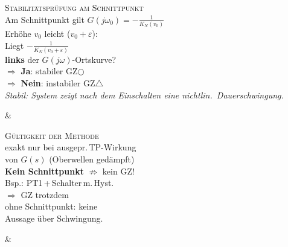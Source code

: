 
\begin{formelreihe}
  \parbox[t]{\linewidth}{%
    {\scriptsize\scshape\color{gray!65!black} Stabilitätsprüfung am Schnittpunkt}\\[0.03em]%
    \scriptsize
    Am Schnittpunkt gilt $G(j\omega_0)=-\tfrac{1}{K_N(v_0)}$\\[0.04em]
    Erhöhe $v_0$ leicht ($v_0\!+\!\varepsilon$):\\[0.03em]
    Liegt $-\tfrac{1}{K_N(v_0\!+\!\varepsilon)}$\\
    \quad\textbf{links} der $G(j\omega)$-Ortskurve?\\[0.04em]
    $\Rightarrow$ \textbf{Ja}: stabiler GZ\;$\bigcirc$\\[0.03em]
    $\Rightarrow$ \textbf{Nein}: instabiler GZ\;$\triangle$\\[0.05em]
    \textit{\color{red!70!black} Stabil: System zeigt nach dem Einschalten eine nichtlin.\ Dauerschwingung.}} &
  \parbox[t]{\linewidth}{%
    {\scriptsize\scshape\color{gray!65!black} Gültigkeit der Methode}\\[0.03em]%
    \scriptsize
    exakt nur bei ausgepr.\,TP-Wirkung\\
    von $G(s)$ (Oberwellen gedämpft)\\[0.04em]
    \textbf{Kein Schnittpunkt} $\not\Rightarrow$ kein GZ!\\[0.03em]
    Bsp.: PT1\,+\,Schalter\,m.\,Hyst.\\
    $\Rightarrow$ GZ trotzdem\\[0.04em]
    ohne Schnittpunkt: keine\\
    Aussage über Schwingung.} &
   \\[0.3em]
\end{formelreihe}
\bereichende


